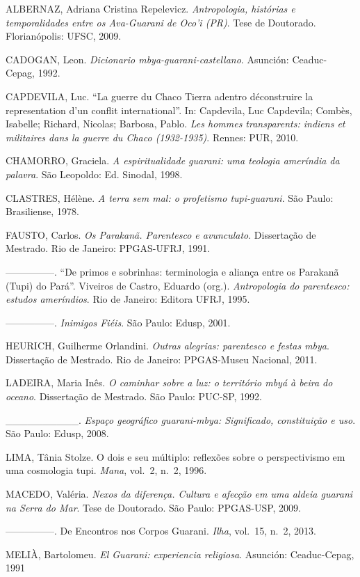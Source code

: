 ALBERNAZ, Adriana Cristina Repelevicz. \emph{Antropologia, histórias e
temporalidades entre os Ava-Guarani de Oco’i (PR)}. Tese de Doutorado.
Florianópolis: UFSC, 2009.

CADOGAN, Leon. \emph{Dicionario mbya-guarani-castellano}. Asunción: Ceaduc-
Cepag, 1992.

CAPDEVILA, Luc. ``La guerre du Chaco Tierra adentro déconstruire la
representation d’un conflit international''. In: Capdevila, Luc
Capdevila; Combès, Isabelle; Richard, Nicolas; Barbosa, Pablo. \emph{Les
hommes transparents: indiens et militaires dans la guerre du Chaco
(1932-1935)}. Rennes: PUR, 2010.

CHAMORRO, Graciela. \emph{A espiritualidade guarani: uma teologia ameríndia
da palavra}. São Leopoldo: Ed. Sinodal, 1998.

CLASTRES, Hélène. \emph{A terra sem mal: o profetismo tupi-guarani}. São Paulo:
Brasiliense, 1978.

FAUSTO, Carlos. \emph{Os Parakanã. Parentesco e avunculato}. Dissertação de
Mestrado. Rio de Janeiro: PPGAS-UFRJ, 1991.

—————. ``De primos e sobrinhas: terminologia e aliança entre os Parakanã
(Tupi) do Pará''. Viveiros de Castro, Eduardo (org.). \emph{Antropologia do
parentesco: estudos ameríndios}. Rio de Janeiro: Editora UFRJ, 1995.

—————. \emph{Inimigos Fiéis}. São Paulo: Edusp, 2001.

HEURICH, Guilherme Orlandini. \emph{Outras alegrias: parentesco e festas mbya}.
 Dissertação de Mestrado. Rio de Janeiro: PPGAS-Museu Nacional, 2011.

LADEIRA, Maria Inês. \emph{O caminhar sobre a luz: o território mbyá à beira
do oceano}. Dissertação de Mestrado. São Paulo: PUC-SP, 1992.

\_\_\_\_\_\_\_\_\_\_. \emph{Espaço geográfico guarani-mbya: Significado,
constituição e uso}. São Paulo: Edusp, 2008.

LIMA, Tânia Stolze. O dois e seu múltiplo: reflexões sobre o
perspectivismo em uma cosmologia tupi. \emph{Mana}, vol.~2, n.~2, 1996.

MACEDO, Valéria. \emph{Nexos da diferença. Cultura e afecção em uma aldeia
guarani na Serra do Mar}. Tese de Doutorado. São Paulo: PPGAS-USP, 2009.

—————. De Encontros nos Corpos Guarani. \emph{Ilha}, vol.~15, n.~2, 2013.

MELIÀ, Bartolomeu. \emph{El Guarani: experiencia religiosa}. Asunción:
Ceaduc-Cepag, 1991


